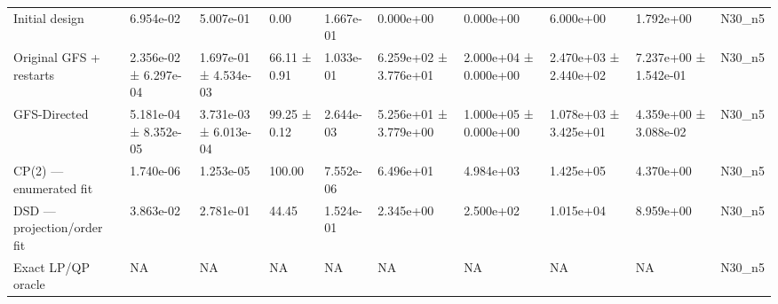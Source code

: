 \begin{table}
\begin{tabular}{llllllllll}
Initial design & 6.954e-02 & 5.007e-01 & 0.00 & 1.667e-01 & 0.000e+00 & 0.000e+00 & 6.000e+00 & 1.792e+00 & N30\_n5 \\
Original GFS + restarts & 2.356e-02 ± 6.297e-04 & 1.697e-01 ± 4.534e-03 & 66.11 ± 0.91 & 1.033e-01 & 6.259e+02 ± 3.776e+01 & 2.000e+04 ± 0.000e+00 & 2.470e+03 ± 2.440e+02 & 7.237e+00 ± 1.542e-01 & N30\_n5 \\
GFS-Directed & 5.181e-04 ± 8.352e-05 & 3.731e-03 ± 6.013e-04 & 99.25 ± 0.12 & 2.644e-03 & 5.256e+01 ± 3.779e+00 & 1.000e+05 ± 0.000e+00 & 1.078e+03 ± 3.425e+01 & 4.359e+00 ± 3.088e-02 & N30\_n5 \\
CP(2) — enumerated fit & 1.740e-06 & 1.253e-05 & 100.00 & 7.552e-06 & 6.496e+01 & 4.984e+03 & 1.425e+05 & 4.370e+00 & N30\_n5 \\
DSD — projection/order fit & 3.863e-02 & 2.781e-01 & 44.45 & 1.524e-01 & 2.345e+00 & 2.500e+02 & 1.015e+04 & 8.959e+00 & N30\_n5 \\
Exact LP/QP oracle & NA & NA & NA & NA & NA & NA & NA & NA & N30\_n5 \\
\bottomrule
\end{tabular}
\end{table}
